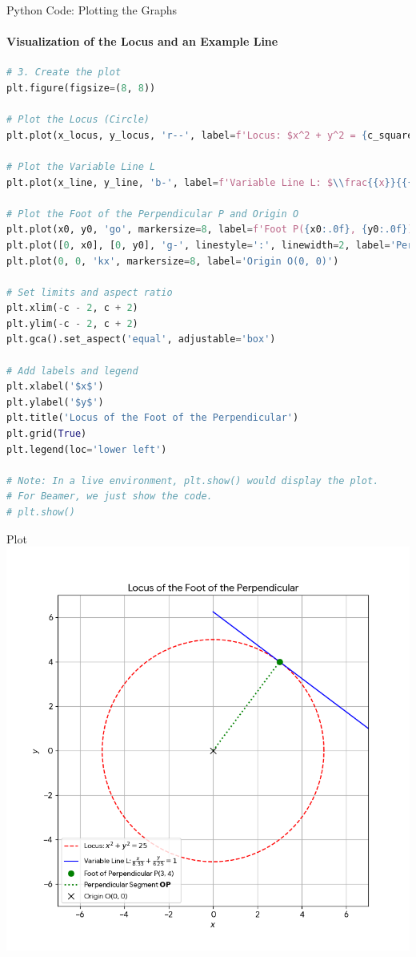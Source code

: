 \documentclass{beamer}
\begin{document}
\begin{frame}[fragile]{Python Code: Plotting the Graphs}
    \framesubtitle{Visualization of the Locus and an Example Line}
    
    \lstset{style=PythonStyle}
    \begin{lstlisting}[language=Python]
# 3. Create the plot
plt.figure(figsize=(8, 8))

# Plot the Locus (Circle)
plt.plot(x_locus, y_locus, 'r--', label=f'Locus: $x^2 + y^2 = {c_squared:.0f}$')

# Plot the Variable Line L
plt.plot(x_line, y_line, 'b-', label=f'Variable Line L: $\\frac{{x}}{{{a:.2f}}} + \\frac{{y}}{{{b:.2f}}} = 1$')

# Plot the Foot of the Perpendicular P and Origin O
plt.plot(x0, y0, 'go', markersize=8, label=f'Foot P({x0:.0f}, {y0:.0f})')
plt.plot([0, x0], [0, y0], 'g-', linestyle=':', linewidth=2, label='Perpendicular Segment $\\mathbf{OP}$')
plt.plot(0, 0, 'kx', markersize=8, label='Origin O(0, 0)')

# Set limits and aspect ratio
plt.xlim(-c - 2, c + 2)
plt.ylim(-c - 2, c + 2)
plt.gca().set_aspect('equal', adjustable='box')

# Add labels and legend
plt.xlabel('$x$')
plt.ylabel('$y$')
plt.title('Locus of the Foot of the Perpendicular')
plt.grid(True)
plt.legend(loc='lower left')

# Note: In a live environment, plt.show() would display the plot.
# For Beamer, we just show the code.
# plt.show() 
    \end{lstlisting}
\end{frame}

\begin{frame}{Plot}
    \centering
    \includegraphics[width=\columnwidth, height=0.8\textheight, keepaspectratio]{figs/python_plot.png}     
\end{frame}
\end{document}
